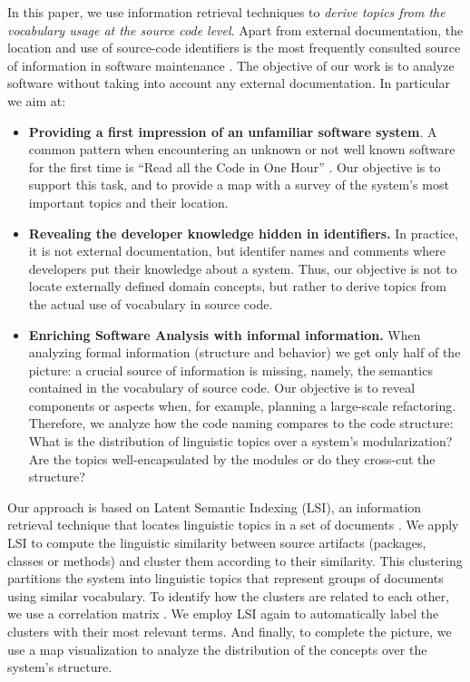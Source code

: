 In this paper, we use information retrieval techniques to \emph{derive topics from the vocabulary usage at the source code level}. Apart from external documentation, the location and use of source-code identifiers is the most frequently consulted source of information in software maintenance \cite{Kosk04a}. The objective of our work is to analyze software without taking into account any external documentation. In particular we aim at:

\begin{itemize}
  \item \textbf{Providing a first impression of an unfamiliar software system}. A common pattern when encountering an unknown or not well known software for the first time is ``Read all the Code in One Hour'' \cite{Deme02a}. Our objective is to support this task, and to provide a map with a survey of the system's most important topics and their location.
  \item \textbf{Revealing the developer knowledge hidden in identifiers.} In practice, it is not external documentation, but identifer names and comments where developers put their knowledge about a system. Thus, our objective is not to locate externally defined domain concepts, but rather to derive topics from the actual use of vocabulary in source code.
  \item \textbf{Enriching Software Analysis with informal information.} When analyzing formal information (\eg structure and behavior) we get only half of the picture: a crucial source of information is missing, namely, the semantics contained in the vocabulary of source code. Our objective is to reveal components or aspects when, for example, planning a large-scale refactoring. Therefore, we analyze how the code naming compares to the code structure: What is the distribution of linguistic topics over a system's modularization? Are the topics well-encapsulated by the modules or do they cross-cut the structure?
\end{itemize}


Our approach is based on Latent Semantic Indexing (LSI), an information retrieval technique that locates linguistic topics in a set of documents \cite{Deer90a,Marc04a}. We apply LSI to compute the linguistic similarity between source artifacts (\eg packages, classes or methods) and cluster them according to their similarity. This clustering partitions the system into linguistic topics that represent groups of documents using similar vocabulary. To identify how the clusters are related to each other, we use a correlation matrix \cite{Ling73a}. We employ LSI again to automatically label the clusters with their most relevant terms. And finally, to complete the picture, we use a map visualization to analyze the distribution of the concepts over the system's structure.

